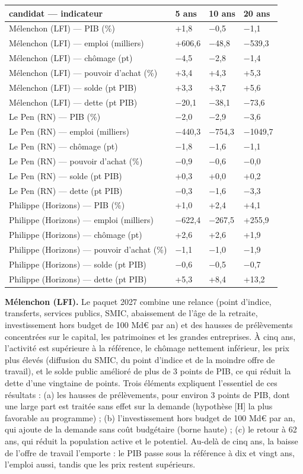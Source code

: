 \documentclass[
  11pt,
  11pt,
  a4paper,
  openany]{book}
\begin{document}
\begin{longtable}[]{@{}llll@{}}
\toprule\noalign{}
candidat --- indicateur & 5 ans & 10 ans & 20 ans \\
\midrule\noalign{}
\endhead
\bottomrule\noalign{}
\endlastfoot
Mélenchon (LFI) --- PIB (\%) & +1,8 & −0,5 & −1,1 \\
Mélenchon (LFI) --- emploi (milliers) & +606,6 & −48,8 & −539,3 \\
Mélenchon (LFI) --- chômage (pt) & −4,5 & −2,8 & −1,4 \\
Mélenchon (LFI) --- pouvoir d'achat (\%) & +3,4 & +4,3 & +5,3 \\
Mélenchon (LFI) --- solde (pt PIB) & +3,3 & +3,7 & +5,6 \\
Mélenchon (LFI) --- dette (pt PIB) & −20,1 & −38,1 & −73,6 \\
Le Pen (RN) --- PIB (\%) & −2,0 & −2,9 & −3,6 \\
Le Pen (RN) --- emploi (milliers) & −440,3 & −754,3 & −1049,7 \\
Le Pen (RN) --- chômage (pt) & −1,8 & −1,6 & −1,1 \\
Le Pen (RN) --- pouvoir d'achat (\%) & −0,9 & −0,6 & −0,0 \\
Le Pen (RN) --- solde (pt PIB) & +0,3 & +0,0 & +0,2 \\
Le Pen (RN) --- dette (pt PIB) & −0,3 & −1,6 & −3,3 \\
Philippe (Horizons) --- PIB (\%) & +1,0 & +2,4 & +4,1 \\
Philippe (Horizons) --- emploi (milliers) & −622,4 & −267,5 & +255,9 \\
Philippe (Horizons) --- chômage (pt) & +2,6 & +2,6 & +1,9 \\
Philippe (Horizons) --- pouvoir d'achat (\%) & −1,1 & −1,0 & −1,9 \\
Philippe (Horizons) --- solde (pt PIB) & −0,6 & −0,5 & −0,7 \\
Philippe (Horizons) --- dette (pt PIB) & +5,3 & +8,4 & +13,2 \\
\end{longtable}

\textbf{Mélenchon (LFI).} Le paquet 2027 combine une relance (point
d'indice, transferts, services publics, SMIC, abaissement de l'âge de la
retraite, investissement hors budget de 100 Md€ par an) et des hausses
de prélèvements concentrées sur le capital, les patrimoines et les
grandes entreprises. À cinq ans, l'activité est supérieure à la
référence, le chômage nettement inférieur, les prix plus élevés
(diffusion du SMIC, du point d'indice et de la moindre offre de
travail), et le solde public amélioré de plus de 3 points de PIB, ce qui
réduit la dette d'une vingtaine de points. Trois éléments expliquent
l'essentiel de ces résultats : (a) les hausses de prélèvements, pour
environ 3 points de PIB, dont une large part est traitée sans effet sur
la demande (hypothèse {[}H{]} la plus favorable au programme) ; (b)
l'investissement hors budget de 100 Md€ par an, qui ajoute de la demande
sans coût budgétaire (borne haute) ; (c) le retour à 62 ans, qui réduit
la population active et le potentiel. Au-delà de cinq ans, la baisse de
l'offre de travail l'emporte : le PIB passe sous la référence à dix et
vingt ans, l'emploi aussi, tandis que les prix restent supérieurs.
\end{document}
